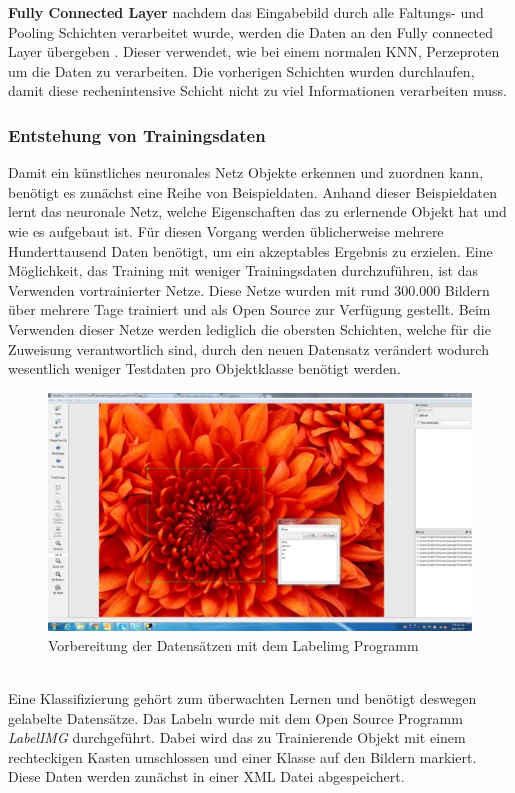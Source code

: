 \documentclass[a4paper,12pt,oneside]{article}
\begin{document}
\textbf{Fully Connected Layer}
nachdem das Eingabebild durch alle Faltungs- und Pooling Schichten verarbeitet wurde, werden die Daten an den Fully connected Layer übergeben \cite[14]{sermanet2012convolutional}. Dieser verwendet, wie bei einem normalen KNN, Perzeproten um die Daten zu verarbeiten. Die vorherigen Schichten wurden durchlaufen, damit diese rechenintensive Schicht nicht zu viel Informationen verarbeiten muss. 
  \subsubsection{Entstehung von Trainingsdaten}\label{s.trainingsdaten} 
Damit ein künstliches neuronales Netz Objekte erkennen und zuordnen kann, benötigt es zunächst eine Reihe von Beispieldaten. Anhand dieser Beispieldaten lernt das neuronale Netz, welche Eigenschaften das zu erlernende Objekt hat und wie es aufgebaut ist. Für diesen Vorgang werden üblicherweise mehrere Hunderttausend Daten benötigt, um ein akzeptables Ergebnis zu erzielen. Eine Möglichkeit, das Training mit weniger Trainingsdaten durchzuführen, ist das Verwenden vortrainierter Netze. Diese Netze wurden mit rund 300.000 Bildern über mehrere Tage trainiert und als Open Source zur Verfügung gestellt. Beim Verwenden dieser Netze werden lediglich die obersten Schichten, welche für die Zuweisung verantwortlich sind, durch den neuen Datensatz verändert wodurch wesentlich weniger Testdaten pro Objektklasse benötigt werden. 



\begin{figure}
	[h]
	\centering
	\includegraphics[scale=1.0]{Sources/labelimg.jpg}
	\caption{Vorbereitung der Datensätzen mit dem Labelimg Programm \cite{labelimg2019}}
	\label{img:labelimg}
\end{figure}\\
Eine Klassifizierung gehört zum überwachten Lernen und benötigt deswegen gelabelte Datensätze. Das Labeln wurde mit dem Open Source Programm \textit{LabelIMG} \cite{labelimg2019} durchgeführt. Dabei wird das zu Trainierende Objekt mit einem rechteckigen Kasten umschlossen und einer Klasse auf den Bildern markiert. Diese Daten werden zunächst in einer XML Datei abgespeichert. 
\end{document}
